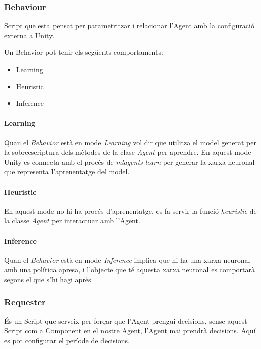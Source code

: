 \documentclass{article}
\begin{document}
    \subsubsection{Behaviour}
    Script que esta pensat per parametritzar i relacionar l’Agent amb la configuració externa a Unity.
    
    Un Behavior pot tenir els següents comportaments:
    \begin{itemize}
        \item Learning
        \item Heuristic
        \item Inference
    \end{itemize}
    
  \paragraph{Learning}
    Quan el \textit{Behavior} està en mode \textit{Learning} vol dir que utilitza el model generat per la sobreescriptura dels mètodes de la clase \textit{Agent} per aprendre. En aquest mode Unity es connecta amb el procés de \textit{mlagents-learn} per generar la xarxa neuronal que representa l'aprenentatge del model.
    
    \paragraph{Heuristic}
    En aquest mode no hi ha procés d'aprenentatge, es fa servir la funció \textit{heuristic} de la classe \textit{Agent} per interactuar amb l'Agent.
    
    \newpage
    
   \paragraph{Inference}
    Quan el \textit{Behavior} està en mode \textit{Inference} implica que hi ha una xarxa neuronal amb una política apresa, i l'objecte que té aquesta xarxa neuronal es comportarà segons el que s'hi hagi après.
    
    \subsubsection{Requester}
    És un Script que serveix per forçar que l'Agent prengui decisions, sense aquest Script com a Component en el nostre Agent, l'Agent mai prendrà decisions. Aquí es pot configurar el període de decisions.
    
\end{document}
